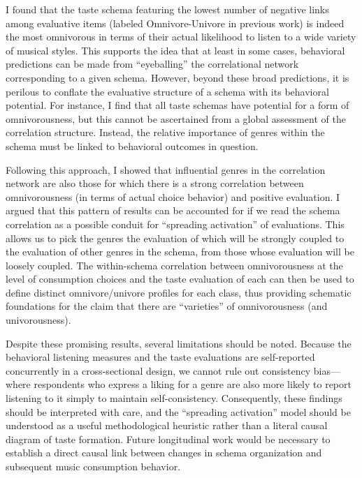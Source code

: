 \documentclass[preprint, authoryear,11pt, 3p]{elsarticle}
\begin{document}
I found that the taste schema featuring the lowest number of negative links among evaluative items (labeled Omnivore-Univore in previous work) is indeed the most omnivorous in terms of their actual likelihood to listen to a wide variety of musical styles. This supports the idea that at least in some cases, behavioral predictions can be made from ``eyeballing'' the correlational network corresponding to a given schema. However, beyond these broad predictions, it is perilous to conflate the evaluative structure of a schema with its behavioral potential. For instance, I find that all taste schemas have potential for a form of omnivorousness, but this cannot be ascertained from a global assessment of the correlation structure. Instead, the relative importance of genres within the schema must be linked to behavioral outcomes in question. 

Following this approach, I showed that influential genres in the correlation network are also those for which there is a strong correlation between omnivorousness (in terms of actual choice behavior) and positive evaluation. I argued that this pattern of results can be accounted for if we read the schema correlation as a possible conduit for ``spreading activation'' of evaluations. This allows us to pick the genres the evaluation of which will be strongly coupled to the evaluation of other genres in the schema, from those whose evaluation will be loosely coupled. The within-schema correlation between omnivorousness at the level of consumption choices and the taste evaluation of each can then be used to define distinct omnivore/univore profiles for each class, thus providing schematic foundations for the claim that there are ``varieties'' of omnivorousness (and univorousness).

Despite these promising results, several limitations should be noted. Because the behavioral listening measures and the taste evaluations are self-reported concurrently in a cross-sectional design, we cannot rule out consistency bias—where respondents who express a liking for a genre are also more likely to report listening to it simply to maintain self-consistency. Consequently, these findings should be interpreted with care, and the ``spreading activation'' model should be understood as a useful methodological heuristic rather than a literal causal diagram of taste formation. Future longitudinal work would be necessary to establish a direct causal link between changes in schema organization and subsequent music consumption behavior. 
\end{document}
